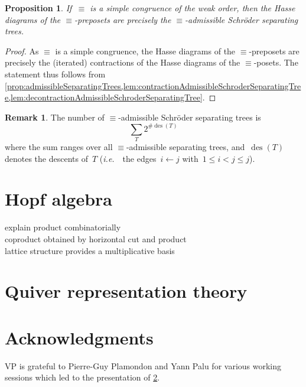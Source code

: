 \documentclass{amsart}
\newtheorem{proposition}[theorem]{Proposition}
\theoremstyle{definition}
\newtheorem{remark}[theorem]{Remark}
\DeclareMathOperator{\des}{des} %
\newcommand{\ie}{\textit{i.e.}~} %
\begin{document}

\begin{proposition}
\label{prop:admissibleSchroderSeparatingTrees}
If~$\equiv$ is a simple congruence of the weak order, then the Hasse diagrams of the $\equiv$-preposets are precisely the $\equiv$-admissible Schröder separating trees.
\end{proposition}

\begin{proof}
As $\equiv$ is a simple congruence, the Hasse diagrams of the $\equiv$-preposets are precisely the (iterated) contractions of the Hasse diagrams of the $\equiv$-posets.
The statement thus follows from \cref{prop:admissibleSeparatingTrees,lem:contractionAdmissibleSchroderSeparatingTree,lem:decontractionAdmissibleSchroderSeparatingTree}.
\end{proof}

\begin{remark}
The number of $\equiv$-admissible Schröder separating trees is
\[
\sum_T 2^{\#\des(T)}
\]
where the sum ranges over all $\equiv$-admissible separating trees, and~$\des(T)$ denotes the descents of~$T$ (\ie~the edges~$i \leftarrow j$ with~$1 \le i < j \le j$).
\end{remark}


\section{Hopf algebra}
\label{sec:HopfAlgebra}

explain product combinatorially \\
coproduct obtained by horizontal cut and product \\
lattice structure provides a multiplicative basis


\section{Quiver representation theory}
\label{subsec:representationTheory}


\section*{Acknowledgments}

VP is grateful to Pierre-Guy Plamondon and Yann Palu for various working sessions which led to the presentation of \cref{subsec:representationTheory}.




\label{sec:biblio}
\end{document}
